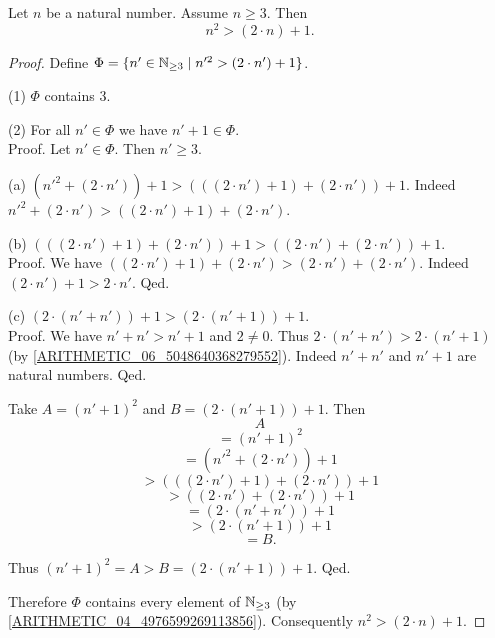 \documentclass[../arithmetic.tex]{subfiles}
\begin{document}
  \begin{forthel}
    \begin{proposition}
      Let $n$ be a natural number.
      Assume $n \geq 3$.
      Then \[ n^{2} > (2 \cdot n) + 1. \]
    \end{proposition}
    \begin{proof}
      Define $\Phi = \{ n' \in \mathbb{N}_{\geq 3} \mid n'^{2} > (2 \cdot n') + 1 \}$.

      (1) $\Phi$ contains $3$.

      (2) For all $n' \in \Phi$ we have $n' + 1 \in \Phi$. \\
      Proof.
        Let $n' \in \Phi$.
        Then $n' \geq 3$.

        (a) $(n'^{2} + (2 \cdot n')) + 1
        > (((2 \cdot n') + 1) + (2 \cdot n')) + 1$.
        Indeed $n'^{2} + (2 \cdot n') > ((2 \cdot n') + 1) + (2 \cdot n')$.

        (b) $(((2 \cdot n') + 1) + (2 \cdot n')) + 1
        > ((2 \cdot n') + (2 \cdot n')) + 1$. \\
        Proof.
          We have $((2 \cdot n') + 1) + (2 \cdot n')
          > (2 \cdot n') + (2 \cdot n')$.
          Indeed $(2 \cdot n') + 1 > 2 \cdot n'$.
        Qed.

        (c) $(2 \cdot (n' + n')) + 1 > (2 \cdot (n' + 1)) + 1$. \\
        Proof.
          We have $n' + n' > n' + 1$ and $2 \neq 0$.
          Thus $2 \cdot (n' + n') > 2 \cdot (n' + 1)$
          (by \cref{ARITHMETIC_06_5048640368279552}).
          Indeed $n' + n'$ and $n' + 1$ are natural numbers.
        Qed.

        Take $A = (n' + 1)^{2}$ and $B = (2 \cdot (n' + 1)) + 1$. %
        Then
        \[  A                                             \]
        \[    = (n' + 1)^{2}                              \]
        \[    = (n'^{2} + (2 \cdot n')) + 1               \]
        \[    > (((2 \cdot n') + 1) + (2 \cdot n')) + 1   \]  %
        \[    > ((2 \cdot n') + (2 \cdot n')) + 1         \]  %
        \[    = (2 \cdot (n' + n')) + 1                   \]
        \[    > (2 \cdot (n' + 1)) + 1                    \]  %
        \[    = B.                                        \]

        Thus $(n' + 1)^{2} = A > B = (2 \cdot (n' + 1)) + 1$.
      Qed.

      Therefore $\Phi$ contains every element of $\mathbb{N}_{\geq 3}$
      (by \cref{ARITHMETIC_04_4976599269113856}).
      Consequently $n^{2} > (2 \cdot n) + 1$.
    \end{proof}
  \end{forthel}
\end{document}
